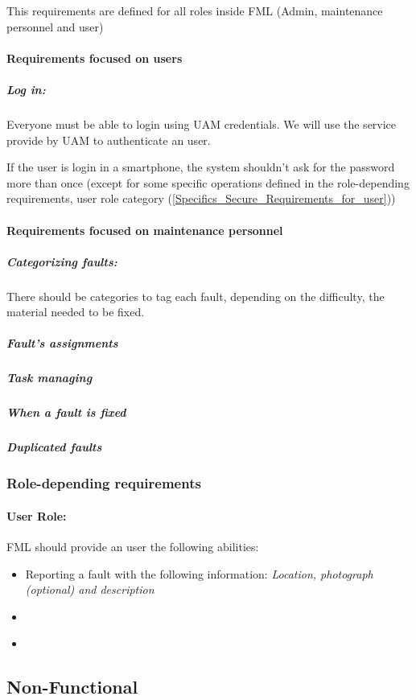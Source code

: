 \documentclass{report}
\begin{document}
This requirements are defined for all roles inside FML (Admin, maintenance personnel and user)

\paragraph{Requirements focused on users}


\subparagraph{Log in: } Everyone must be able to login using UAM credentials. We will use the service provide by UAM to authenticate an user.

If the user is login in a smartphone, the system shouldn't ask for the password more than once (except for some specific operations defined in the role-depending requirements, user role category (\ref{Specifics_Secure_Requirements_for_user}))

\paragraph{Requirements focused on maintenance personnel}

\subparagraph{Categorizing faults: } There should be categories to tag each fault, depending on the difficulty, the material needed to be fixed.

\subparagraph{Fault's assignments}

\subparagraph{Task managing}

\subparagraph{When a fault is fixed} 

\subparagraph{Duplicated faults}


\subsubsection{Role-depending requirements}

\paragraph{User Role: } FML should provide an user the following abilities:
\begin{itemize}
\item Reporting a fault with the following information: \textit{Location, photograph (optional) and description}
\item 
\item \label{Specifics_Secure_Requirements_for_user}
\end{itemize}


\subsection{Non-Functional}
\end{document}
